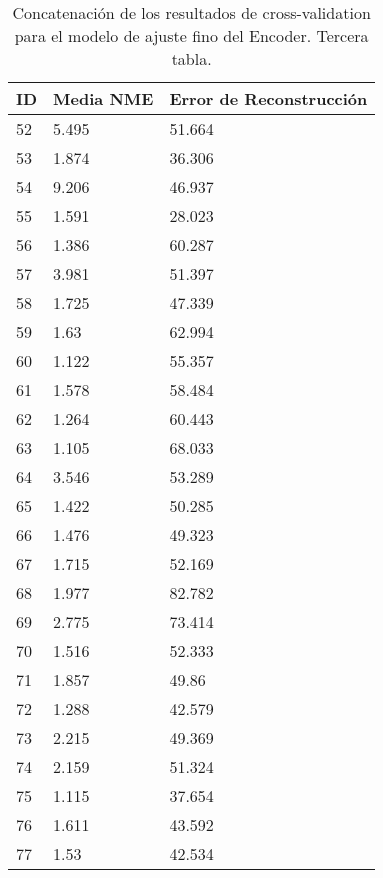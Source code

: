 \begin{table}[!ht]
    \centering
    \caption{Concatenación de los resultados de cross-validation para el modelo de ajuste fino del Encoder. Tercera tabla.}
    \begin{tabular}{|l|l|l|}
    \hline
    \cellcolor{gray!25}\textbf{ID} & \cellcolor{gray!25}\textbf{Media NME} & \cellcolor{gray!25}\textbf{Error de Reconstrucción} \\ \hline
        52 & 5.495 & 51.664 \\ \hline
        53 & 1.874 & 36.306 \\ \hline
        54 & 9.206 & 46.937 \\ \hline
        55 & 1.591 & 28.023 \\ \hline
        56 & 1.386 & 60.287 \\ \hline
        57 & 3.981 & 51.397 \\ \hline
        58 & 1.725 & 47.339 \\ \hline
        59 & 1.63 & 62.994 \\ \hline
        60 & 1.122 & 55.357 \\ \hline
        61 & 1.578 & 58.484 \\ \hline
        62 & 1.264 & 60.443 \\ \hline
        63 & 1.105 & 68.033 \\ \hline
        64 & 3.546 & 53.289 \\ \hline
        65 & 1.422 & 50.285 \\ \hline
        66 & 1.476 & 49.323 \\ \hline
        67 & 1.715 & 52.169 \\ \hline
        68 & 1.977 & 82.782 \\ \hline
        69 & 2.775 & 73.414 \\ \hline
        70 & 1.516 & 52.333 \\ \hline
        71 & 1.857 & 49.86 \\ \hline
        72 & 1.288 & 42.579 \\ \hline
        73 & 2.215 & 49.369 \\ \hline
        74 & 2.159 & 51.324 \\ \hline
        75 & 1.115 & 37.654 \\ \hline
        76 & 1.611 & 43.592 \\ \hline
        77 & 1.53 & 42.534 \\ \hline
    \end{tabular}
\end{table}

